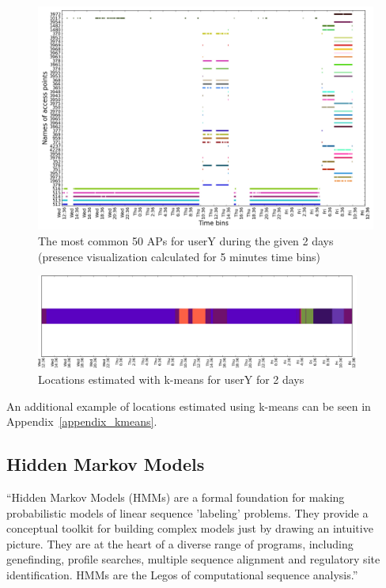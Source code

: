 \begin{figure}[!h]
\centering
\includegraphics[width=\textwidth]{figures/kmeans/user_3_sorted_2days_no_rssi_plot.png}
\caption{The most common 50 APs for userY during the given 2 days (presence
visualization calculated for 5 minutes time bins)}
\label{user_3_days1_2_APs_presence}
\end{figure}

\begin{figure}[!h]
\centering
\includegraphics[width=0.95\textwidth]{figures/kmeans/kmeans_locations_(6)_2days_plot.png}
\caption{Locations estimated with k-means for userY for 2 days}
\label{user_3_days1_2_kmeans}
\end{figure}

An additional example of locations estimated using k-means can be seen in
Appendix~\ref{appendix_kmeans}.

\subsection{Hidden Markov Models}
\label{hmm_section}

``Hidden Markov Models (HMMs) are a formal foundation for making probabilistic
models of linear sequence 'labeling' problems. They provide a conceptual
toolkit for building complex models just by drawing an intuitive picture. They
are at the heart of a diverse range of programs, including genefinding, profile
searches, multiple sequence alignment and regulatory site identification. HMMs
are the Legos of computational sequence analysis.''\cite{JOUR} 

